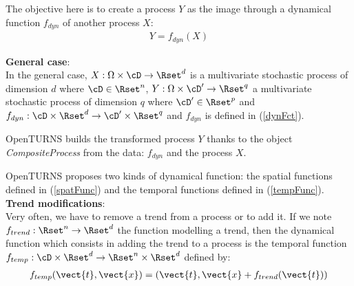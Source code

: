 \renewcommand{\filename}{docUC_StocProc_CompositeProcess.tex}
\renewcommand{\filetitle}{UC : Trend addition, Box Cox transformation, Composite process}

\HeaderIIILevel

\label{UCprocess}



The objective here is to create a process $Y$ as the image through a dynamical function $f_{dyn}$ of another process $X$:
\begin{align*}
  Y=f_{dyn}(X)
\end{align*}

{\bf General case}:\\
In the general case,  $X: \Omega \times\cD \rightarrow \Rset^d$ is a multivariate stochastic process of dimension $d$ where $\cD \in \Rset^n$,   $Y: \Omega \times \cD' \rightarrow \Rset^q$ a multivariate stochastic process of dimension $q$  where $\cD' \in \Rset^p$ and $f_{dyn}:\cD \times \Rset^d \rightarrow \cD' \times \Rset^q$ and $f_{dyn}$ is defined in (\ref{dynFct}).

OpenTURNS builds the transformed process $Y$ thanks to the object \emph{CompositeProcess} from the data: $f_{dyn}$ and the process $X$.

OpenTURNS proposes two kinds of dynamical function: the spatial functions  defined in (\ref{spatFunc}) and the temporal functions defined in (\ref{tempFunc}).\\

{\bf Trend modifications}:\\
Very often, we have to remove a trend from a process or to add it. If we note $f_{trend}: \Rset^n \rightarrow \Rset^d$ the  function modelling a trend, then the dynamical function which consists in adding the trend to a process is the temporal function  $f_{temp}: \cD \times \Rset^d \rightarrow \Rset^n \times \Rset^d$ defined by:
\begin{align}\label{trendTempFunc}
  f_{temp}(\vect{t}, \vect{x})=(\vect{t},  \vect{x} +  f_{trend}(\vect{t}))
\end{align}


